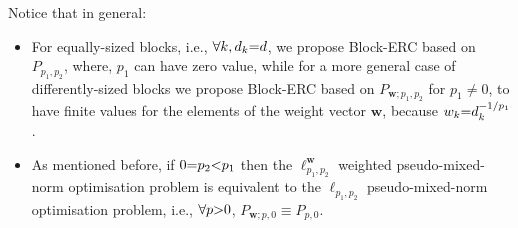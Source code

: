 \begin{remark}[$P_{\boldsymbol{w};p_1,p_2}$ v.s. $P_{p_1,p_2}$]
\label{Rmrk:TwoP} 
Notice that in general:
\begin{itemize}
\item For equally-sized blocks, i.e., $\forall k, d_k {=} d$, we propose Block-ERC based on $P_{p_1,p_2}$, where, $p_1$ can have zero value, while for a more general case of differently-sized blocks we propose Block-ERC based on $P_{\boldsymbol{w};p_1,p_2}$ for $p_1 {\neq} 0$, to have finite values for the elements of the weight vector $\boldsymbol{w}$, because $w_k {=} d_k^{-1/{p_1}}$.
\item As mentioned before, if $0 {=} p_2 {<} p_1$ then the $\ell_{p_1,p_2}^{\boldsymbol{w}}$ weighted pseudo-mixed-norm optimisation problem is equivalent to the $\ell_{p_1,p_2}$ pseudo-mixed-norm optimisation problem, i.e., $\forall p {>} 0$, $P_{\boldsymbol{w};p,0} {\equiv} P_{p,0}$.
\end{itemize} 
\end{remark}